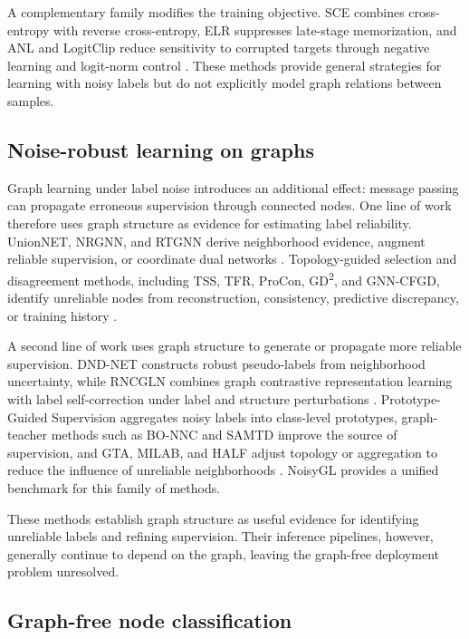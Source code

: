 \documentclass[preprint,12pt]{elsarticle}
\begin{document}
A complementary family modifies the training objective. SCE combines cross-entropy with reverse cross-entropy, ELR suppresses late-stage memorization, and ANL and LogitClip reduce sensitivity to corrupted targets through negative learning and logit-norm control \cite{ref19,ref20,ref21,ref22}. These methods provide general strategies for learning with noisy labels but do not explicitly model graph relations between samples.

\subsection{Noise-robust learning on graphs}\label{sec:2.2}

Graph learning under label noise introduces an additional effect: message passing can propagate erroneous supervision through connected nodes. One line of work therefore uses graph structure as evidence for estimating label reliability. UnionNET, NRGNN, and RTGNN derive neighborhood evidence, augment reliable supervision, or coordinate dual networks \cite{ref9,ref10,ref46}. Topology-guided selection and disagreement methods, including TSS, TFR, ProCon, GD\textsuperscript{2}, and GNN-CFGD, identify unreliable nodes from reconstruction, consistency, predictive discrepancy, or training history \cite{ref40,ref41,ref42,ref44,ref47}.

A second line of work uses graph structure to generate or propagate more reliable supervision. DND-NET constructs robust pseudo-labels from neighborhood uncertainty, while RNCGLN combines graph contrastive representation learning with label self-correction under label and structure perturbations \cite{ref11,ref12}. Prototype-Guided Supervision aggregates noisy labels into class-level prototypes, graph-teacher methods such as BO-NNC and SAMTD improve the source of supervision, and GTA, MILAB, and HALF adjust topology or aggregation to reduce the influence of unreliable neighborhoods \cite{ref45,ref50,ref51,ref58,ref59,ref63}. NoisyGL \cite{ref13} provides a unified benchmark for this family of methods.

These methods establish graph structure as useful evidence for identifying unreliable labels and refining supervision. Their inference pipelines, however, generally continue to depend on the graph, leaving the graph-free deployment problem unresolved.

\subsection{Graph-free node classification}\label{sec:2.3}
\end{document}
